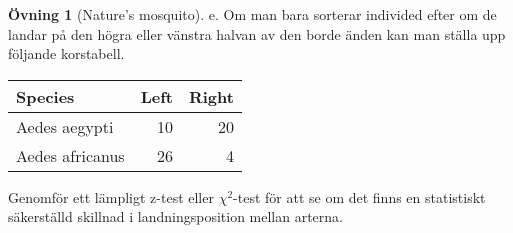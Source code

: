 \documentclass[
]{book}
\theoremstyle{definition}
\theoremstyle{definition}
\theoremstyle{definition}
\newtheorem{exercise}{Övning}[chapter]
\theoremstyle{definition}
\theoremstyle{remark}
\begin{document}
\begin{exercise}[Nature's mosquito]
e. Om man bara sorterar individed efter om de landar på den högra eller vänstra halvan av den borde änden kan man ställa upp följande korstabell.

\begin{table}
\centering
\begin{tabular}[t]{lrr}
\toprule
Species & Left & Right\\
\midrule
Aedes aegypti & 10 & 20\\
Aedes africanus & 26 & 4\\
\bottomrule
\end{tabular}
\end{table}

Genomför ett lämpligt z-test eller \(\chi^2\)-test för att se om det finns en statistiskt säkerställd skillnad i landningsposition mellan arterna.
\end{exercise}
\end{document}
